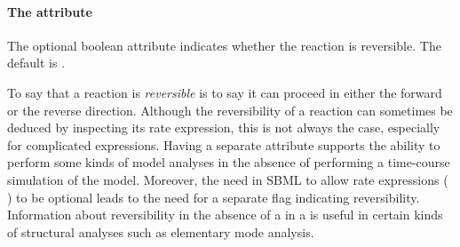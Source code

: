 \paragraph{The  attribute}
\label{sec:reversible}

The optional boolean attribute  indicates whether
the reaction is reversible.  The default is .

To say that a reaction is \emph{reversible} is to say it can
proceed in either the forward or the reverse direction.  Although
the reversibility of a reaction can sometimes be deduced by
inspecting its rate expression, this is not always the case,
especially for complicated expressions.  Having a separate attribute
supports the ability to perform some kinds of model analyses in
the absence of performing a time-course simulation of the model.
Moreover, the need in SBML to allow rate expressions (\ie
\KineticLaw) to be optional leads to the need for a separate flag
indicating reversibility.  Information about reversibility in the
absence of a \KineticLaw in a \Reaction is useful in certain kinds
of structural analyses such as elementary mode analysis.

